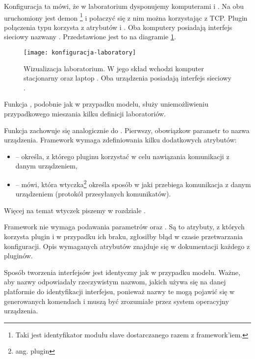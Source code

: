\documentclass[00-praca-magisterska.tex]{subfiles}
\begin{document}
Konfiguracja ta mówi, że w laboratorium  dysponujemy komputerami
 i . Na obu uruchomiony jest demon
\footnote{Taki jest identyfikator modułu slave dostarczanego
razem z framework'iem.} i połaczyć się z nim można korzystając z TCP. Plugin
połączenia typu  korzysta z atrybutów  i . Oba
komputery posiadają interfejs sieciowy nazwany . Przedstawione jest
to na diagramie \ref{fig:konfiguracja-laboratory}.

\begin{figure}[htb]
\begin{center}
\leavevmode
\texttt{[image: konfiguracja-laboratory]}
\end{center}
\caption{Wizualizacja laboratorium. W jego skład wchodzi komputer stacjonarny
 oraz laptop . Oba urządzenia posiadają interfejs
sieciowy .}
\label{fig:konfiguracja-laboratory}
\end{figure}

Funkcja , podobnie jak w przypadku modelu, służy
uniemożliwieniu przypadkowego mieszania kilku definicji laboratoriów.

Funkcja  zachowuje się analogicznie do .
Pierwszy, obowiązkow parametr to nazwa urządzenia. Framework wymaga
zdefiniowania kilku dodatkowych atrybutów:
\begin{itemize}
\item {} -- określa, z którego pluginu korzystać w celu
nawiązania komunikacji z danym urządzeniem,
\item {} -- mówi, która wtyczka\footnote{ang. plugin} określa
sposób w jaki przebiega komunikacja z danym urządzeniem (protokół przesyłanych
komunikatów).
\end{itemize}

Więcej na temat wtyczek piszemy w rozdziale .

Framework nie wymaga podawania parametrów  oraz . Są to
atrybuty, z których korzysta plugin  i w przypadku ich braku,
zgłosiłby błąd w czasie przetwarzania konfiguracji. Opis wymaganych atrybutów
znajduje się w dokumentacji każdego z pluginów.

Sposób tworzenia interfejsów jest identyczny jak w przypadku modelu. Ważne, aby
nazwy odpowiadały rzeczywistym nazwom, jakich używa się na danej platformie do
identyfikacji interfejsu, ponieważ nazwy te mogą pojawić się w generowanych
komendach i muszą być zrozumiałe przez system operacyjny urządzenia.
\end{document}
